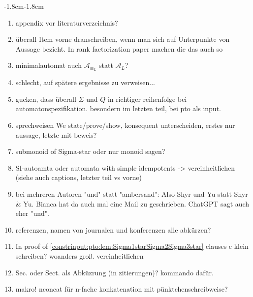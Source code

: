 \begin{adjustwidth}{-1.8cm}{-1.8cm}
\begin{enumerate}[itemsep=-5pt]
		\item appendix vor literaturverzeichnis?
		
		\item überall Item vorne dranschreiben, wenn man sich auf Unterpunkte von Aussage bezieht. In rank factorization paper machen die das auch so
		
		\item minimalautomat auch $\mathcal A_{\equiv_L}$ statt $\mathcal A_L$?
		
		\item schlecht, auf spätere ergebnisse zu verweisen...
			
		\item gucken, dass überall $\Sigma$ und $Q$ in richtiger reihenfolge bei automatonspezifikation. besondern im letzten teil, bei pto als input.		
		
		\item sprechweisen We state/prove/show, konsequent unterscheiden, erstes nur aussage, letzte mit beweis?		
		
		\item submonoid of Sigma-star oder nur monoid sagen?
		
		\item SI-autoamta oder automata with simple idempotents -> vereinheitlichen (siehe auch captions, letzter teil vs vorne)
		
		\item bei mehreren Autoren "und" statt "ambersand": Also Shyr und Yu statt Shyr \& Yu. Bianca hat da auch mal eine Mail zu geschrieben. ChatGPT sagt auch eher "und".
		
		\item referenzen, namen von journalen und konferenzen alle abkürzen?
		
		\item In proof of \cref{constrinput:pto:lem:Sigma1starSigma2Sigma3star} clauses c klein schreiben? woanders groß. vereinheitlichen
		
		\item Sec. oder Sect. als Abküzrung (in zitierungen)? kommando dafür. 
				
		\item makro! nconcat für n-fache konkatenation mit pünktchenschreibweise? 
		
	\end{enumerate}
\end{adjustwidth}



